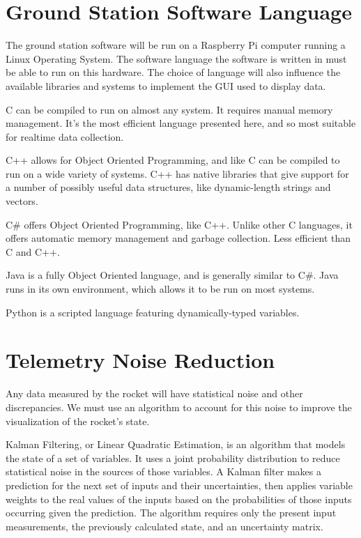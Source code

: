 \documentclass[onecolumn, draftclsnofoot,10pt, compsoc]{IEEEtran}
\begin{document}

	\newpage
		
	\section{Ground Station Software Language}
		\noindent
		The ground station software will be run on a Raspberry Pi computer running a Linux Operating System.
		The software language the software is written in must be able to run on this hardware.
		The choice of language will also influence the available libraries and systems to implement the GUI used to display data.
		
		\noindent
		C can be compiled to run on almost any system.
		It requires manual memory management.
		It's the most efficient language presented here, and so most suitable for realtime data collection.
			
		\noindent
		C++ allows for Object Oriented Programming, and like C can be compiled to run on a wide variety of systems.
		C++ has native libraries that give support for a number of possibly useful data structures, like dynamic-length strings and vectors.
			
		\noindent
		C\# offers Object Oriented Programming, like C++.
		Unlike other C languages, it offers automatic memory management and garbage collection.
		Less efficient than C and C++.
			
		\noindent
		Java is a fully Object Oriented language, and is generally similar to C\#.
		Java runs in its own environment, which allows it to be run on most systems.
			
		\noindent
		Python is a scripted language featuring dynamically-typed variables.
		
	\section{Telemetry Noise Reduction}
		\noindent
		Any data measured by the rocket will have statistical noise and other discrepancies.
		We must use an algorithm to account for this noise to improve the visualization of the rocket's state.
		
		\noindent
		Kalman Filtering, or Linear Quadratic Estimation, is an algorithm that models the state of a set of variables.
		It uses a joint probability distribution to reduce statistical noise in the sources of those variables.
		A Kalman filter makes a prediction for the next set of inputs and their uncertainties, then applies variable weights to the real values of the inputs based on the probabilities of those inputs occurring given the prediction.
		The algorithm requires only the present input measurements, the previously calculated state, and an uncertainty matrix.
			
\end{document}
